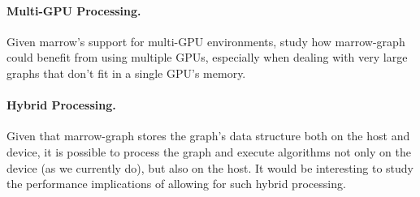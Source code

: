 \paragraph{\textbf{Multi-\gls{GPU} Processing}.} Given marrow's support for multi-\gls{GPU} environments, study how marrow-graph could benefit from using multiple \gls{GPU}s, especially when dealing with very large graphs that don't fit in a single \gls{GPU}'s memory.

\paragraph{\textbf{Hybrid Processing}.} Given that marrow-graph stores the graph's data structure both on the host and device, it is possible to process the graph and execute algorithms not only on the device (as we currently do), but also on the host. It would be interesting to study the performance implications of allowing for such hybrid processing.